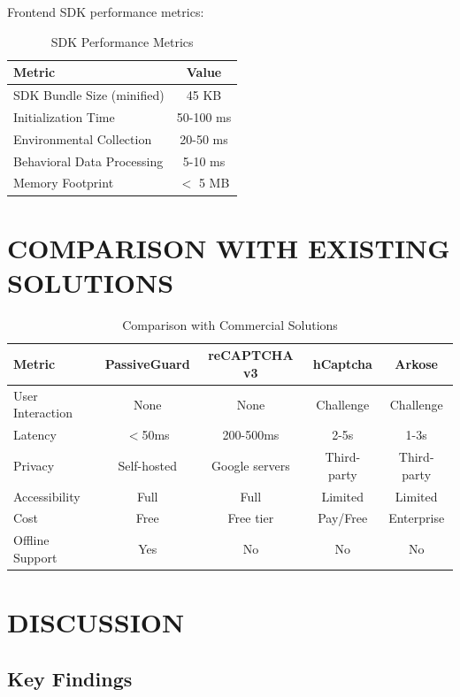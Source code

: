 Frontend SDK performance metrics:

\begin{table}[H]
\centering
\caption{SDK Performance Metrics}
\label{tab:sdk_performance}
\begin{tabular}{|l|c|}
\hline
\textbf{Metric} & \textbf{Value} \\
\hline
SDK Bundle Size (minified) & 45 KB \\
\hline
Initialization Time & 50-100 ms \\
\hline
Environmental Collection & 20-50 ms \\
\hline
Behavioral Data Processing & 5-10 ms \\
\hline
Memory Footprint & $<$ 5 MB \\
\hline
\end{tabular}
\end{table}

\section{COMPARISON WITH EXISTING SOLUTIONS}

\begin{table}[H]
\centering
\caption{Comparison with Commercial Solutions}
\label{tab:comparison}
\begin{tabular}{|l|c|c|c|c|}
\hline
\textbf{Metric} & \textbf{PassiveGuard} & \textbf{reCAPTCHA v3} & \textbf{hCaptcha} & \textbf{Arkose} \\
\hline
User Interaction & None & None & Challenge & Challenge \\
\hline
Latency & $<$50ms & 200-500ms & 2-5s & 1-3s \\
\hline
Privacy & Self-hosted & Google servers & Third-party & Third-party \\
\hline
Accessibility & Full & Full & Limited & Limited \\
\hline
Cost & Free & Free tier & Pay/Free & Enterprise \\
\hline
Offline Support & Yes & No & No & No \\
\hline
\end{tabular}
\end{table}

\section{DISCUSSION}

\subsection{Key Findings}

